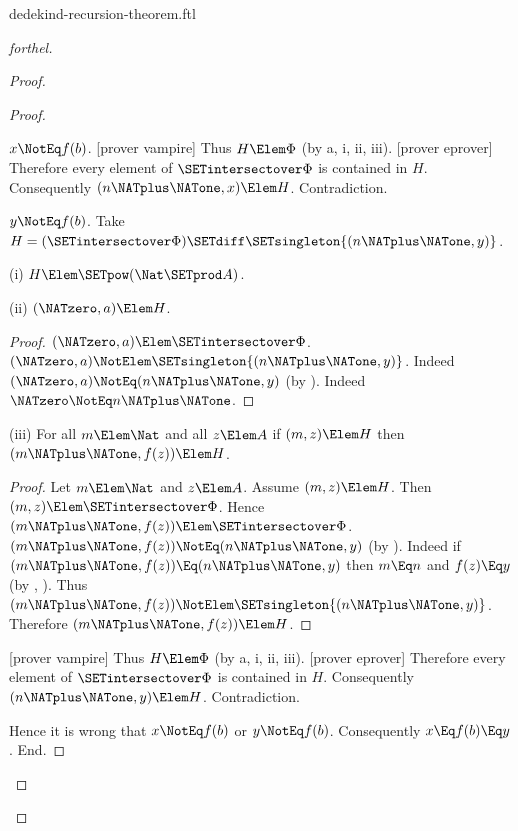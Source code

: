 \documentclass{stex}
\begin{document}
\begin{smodule}{dedekind-recursion-theorem.ftl}
\begin{proof}[forthel]
\begin{proof}
\begin{proof}
\begin{case}{$x \NotEq f(b)$.}
          [prover vampire]
          Thus $H \Elem \Phi$ (by a, i, ii, iii).
          [prover eprover]
          Therefore every element of $\SETintersectover \Phi$ is contained in $H$.
          Consequently $(n \NATplus \NATone,x) \Elem H$.
          Contradiction.
        \end{case}

        \begin{case}{$y \NotEq f(b)$.}
          Take $H = (\SETintersectover \Phi) \SETdiff \SETsingleton{(n \NATplus \NATone,y)}$.

          (i) $H \Elem \SETpow(\Nat \SETprod A)$.

          (ii) $(\NATzero,a) \Elem H$.
          \begin{proof}
            $(\NATzero,a) \Elem \SETintersectover \Phi$.
            $(\NATzero,a) \NotElem \SETsingleton{(n \NATplus \NATone,y)}$.
            Indeed $(\NATzero,a) \NotEq (n \NATplus \NATone,y)$ (by ).
            Indeed $\NATzero \NotEq n \NATplus \NATone$.
          \end{proof}

          (iii) For all $m \Elem \Nat$ and all $z \Elem A$ if $(m,z) \Elem H$ then $(m \NATplus \NATone,f(z)) \Elem H$.
          \begin{proof}
            Let $m \Elem \Nat$ and $z \Elem A$.
            Assume $(m,z) \Elem H$.
            Then $(m,z) \Elem \SETintersectover \Phi$.
            Hence $(m \NATplus \NATone,f(z)) \Elem \SETintersectover \Phi$.
            $(m \NATplus \NATone,f(z)) \NotEq (n \NATplus \NATone,y)$ (by ).
            Indeed if $(m \NATplus \NATone,f(z)) \Eq (n \NATplus \NATone,y)$ then $m \Eq n$ and $f(z) \Eq y$ (by , ).
            Thus $(m \NATplus \NATone,f(z)) \NotElem \SETsingleton{(n \NATplus \NATone,y)}$.
            Therefore $(m \NATplus \NATone,f(z)) \Elem H$.
          \end{proof}

          [prover vampire]
          Thus $H \Elem \Phi$ (by a, i, ii, iii).
          [prover eprover]
          Therefore every element of $\SETintersectover \Phi$ is contained in $H$.
          Consequently $(n \NATplus \NATone,y) \Elem H$.
          Contradiction.
        \end{case}

        Hence it is wrong that $x \NotEq f(b)$ or $y \NotEq f(b)$.
        Consequently $x \Eq f(b) \Eq y$.
      End.


\end{proof}
\end{proof}
\end{proof}
\end{smodule}
\end{document}
